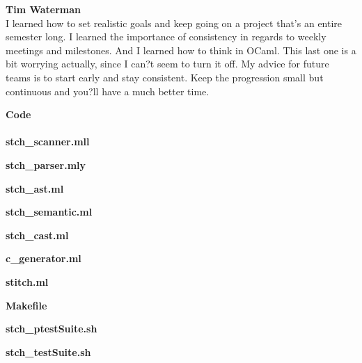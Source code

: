 \documentclass[11pt, oneside]{article}   	%
\newcommand{\tab} {\hspace*{2em}}
\begin{document}
\newpage
\Large\textbf{Tim Waterman}\\[1em]
\normalsize
\tab I learned how to set realistic goals and keep going on a project that's an entire semester long. I learned the importance of consistency in regards to weekly meetings and milestones. And I learned how to think in OCaml. This last one is a bit worrying actually, since I can?t seem to turn it off. My advice for future teams is to start early and stay consistent. Keep the progression small but continuous and you?ll have a much better time.
\newpage

\newpage
\LARGE\textbf{Code}\\[2em]
\normalsize
\tab\\[2em]

\newpage
\Large\textbf{stch\_scanner.mll}\\[1em]
\normalsize

\newpage

\Large\textbf{stch\_parser.mly}\\[1em]
\normalsize

\newpage

\Large\textbf{stch\_ast.ml}\\[1em]
\normalsize

\newpage

\Large\textbf{stch\_semantic.ml}\\[1em]
\normalsize

\newpage

\Large\textbf{stch\_cast.ml}\\[1em]
\normalsize

\newpage

\Large\textbf{c\_generator.ml}\\[1em]
\normalsize

\newpage

\Large\textbf{stitch.ml}\\[1em]
\normalsize

\newpage

\Large\textbf{Makefile}\\[1em]
\normalsize

\newpage

\Large\textbf{stch\_ptestSuite.sh}\\[1em]
\normalsize

\newpage

\Large\textbf{stch\_testSuite.sh}\\[1em]
\normalsize

\newpage
\end{document}
